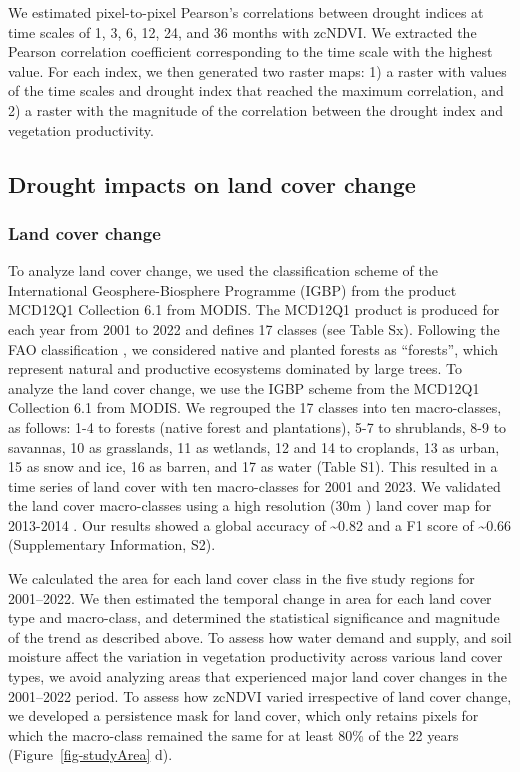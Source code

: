 \documentclass[
  sn-nature,
  numbered]{sn-jnl}
\begin{document}
We estimated pixel-to-pixel Pearson's correlations between drought
indices at time scales of 1, 3, 6, 12, 24, and 36 months with zcNDVI. We
extracted the Pearson correlation coefficient corresponding to the time
scale with the highest value. For each index, we then generated two
raster maps: 1) a raster with values of the time scales and drought
index that reached the maximum correlation, and 2) a raster with the
magnitude of the correlation between the drought index and vegetation
productivity.

\subsection{Drought impacts on land cover
change}\label{drought-impacts-on-land-cover-change}

\subsubsection{Land cover change}\label{land-cover-change}

To analyze land cover change, we used the classification scheme of the
International Geosphere-Biosphere Programme (IGBP) from the product
MCD12Q1 Collection 6.1 from MODIS. The MCD12Q1 product is produced for
each year from 2001 to 2022 and defines 17 classes (see Table Sx).
Following the FAO classification \citep{FAO2022}, we considered native
and planted forests as ``forests'', which represent natural and
productive ecosystems dominated by large trees. To analyze the land
cover change, we use the IGBP scheme from the MCD12Q1 Collection 6.1
from MODIS. We regrouped the 17 classes into ten macro-classes, as
follows: 1-4 to forests (native forest and plantations), 5-7 to
shrublands, 8-9 to savannas, 10 as grasslands, 11 as wetlands, 12 and 14
to croplands, 13 as urban, 15 as snow and ice, 16 as barren, and 17 as
water (Table S1). This resulted in a time series of land cover with ten
macro-classes for 2001 and 2023. We validated the land cover
macro-classes using a high resolution (30m ) land cover map for
2013-2014 \citep{Zhao2016}. Our results showed a global accuracy of
\textasciitilde0.82 and a F1 score of \textasciitilde0.66 (Supplementary
Information, S2).

We calculated the area for each land cover class in the five study
regions for 2001--2022. We then estimated the temporal change in area
for each land cover type and macro-class, and determined the statistical
significance and magnitude of the trend as described above. To assess
how water demand and supply, and soil moisture affect the variation in
vegetation productivity across various land cover types, we avoid
analyzing areas that experienced major land cover changes in the
2001--2022 period. To assess how zcNDVI varied irrespective of land
cover change, we developed a persistence mask for land cover, which only
retains pixels for which the macro-class remained the same for at least
80\% of the 22 years (Figure~\ref{fig-studyArea} d).
\end{document}
